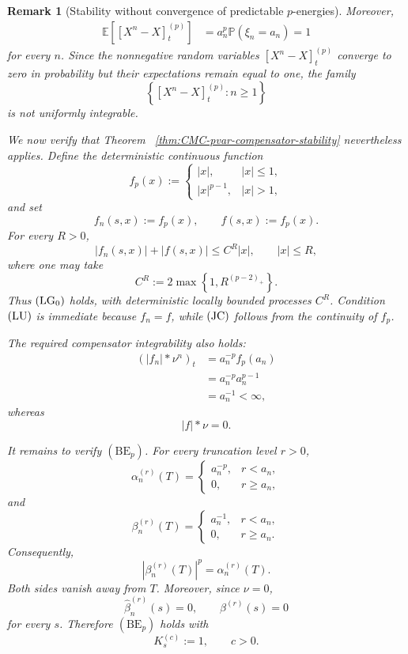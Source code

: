 \documentclass[a4paper,10pt]{article}
\newtheorem{rema}[thm]{Remark}
\renewcommand{\P}{\mathbb P}
\begin{document}
\begin{rema}[Stability without convergence of predictable \(p\)-energies]
Moreover,
\[
\begin{aligned}
\mathbb E\left[
[X^n-X]^{(p)}_t
\right]
&=
a_n^p\P(\xi_n=a_n)=
1
\end{aligned}
\]
for every \(n\). Since the nonnegative random variables
\([X^n-X]^{(p)}_t\) converge to zero in probability but their
expectations remain equal to one, the family
\[
        \left\{[X^n-X]^{(p)}_t:n\ge1\right\}
\]
is not uniformly integrable.

We now verify that Theorem~
\ref{thm:CMC-pvar-compensator-stability} nevertheless applies. Define
the deterministic continuous function
\[
f_p(x)
:=
\begin{cases}
|x|,
& |x|\le1,\\[1mm]
|x|^{p-1},
& |x|>1,
\end{cases}
\]
and set
\[
        f_n(s,x):=f_p(x),
        \qquad
        f(s,x):=f_p(x).
\]
For every \(R>0\),
\[
        |f_n(s,x)|+|f(s,x)|
        \le
        C^R|x|,
        \qquad |x|\le R,
\]
where one may take
\[
        C^R
        :=
        2\max\left\{1,R^{(p-2)_+}\right\}.
\]
Thus \({\rm (LG_0)}\) holds, with deterministic locally bounded
processes \(C^R\). Condition \({\rm (LU)}\) is immediate because
\(f_n=f\), while \({\rm (JC)}\) follows from the continuity of
\(f_p\).

The required compensator integrability also holds:
\[
\begin{aligned}
(|f_n|*\nu^n)_t
&=
a_n^{-p}f_p(a_n)\\
&=
a_n^{-p}a_n^{p-1}\\
&=
a_n^{-1}
<
\infty,
\end{aligned}
\]
whereas
\[
        |f|*\nu=0.
\]

It remains to verify \((\mathrm{BE}_p)\). For every truncation level
\(r>0\),
\[
\alpha_n^{(r)}(T)
=
\begin{cases}
a_n^{-p},& r<a_n,\\
0,&r\ge a_n,
\end{cases}
\]
and
\[
\beta_n^{(r)}(T)
=
\begin{cases}
a_n^{-1},& r<a_n,\\
0,&r\ge a_n.
\end{cases}
\]
Consequently,
\[
        |\beta_n^{(r)}(T)|^p
        =
        \alpha_n^{(r)}(T).
\]
Both sides vanish away from \(T\). Moreover, since \(\nu=0\),
\[
        \widehat\beta_n^{(r)}(s)=0,
        \qquad
        \beta^{(r)}(s)=0
\]
for every \(s\). Therefore \((\mathrm{BE}_p)\) holds with
\[
        K^{(c)}_s:=1,
        \qquad c>0.
\]


\end{rema}
\end{document}
